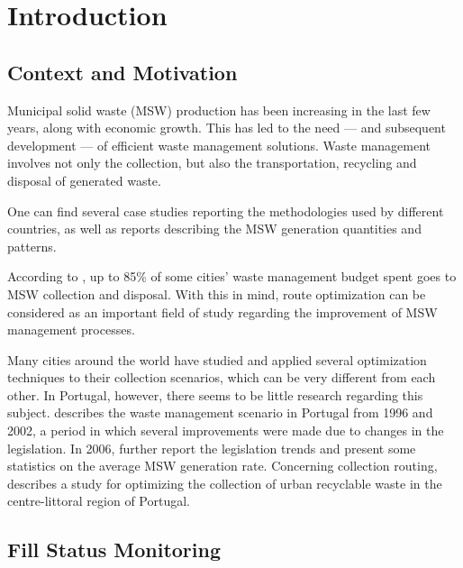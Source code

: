 \chapter{Introduction} \label{chap:intro}

\section*{}


\section{Context and Motivation}
\label{section:context}

Municipal solid waste (MSW) production has been increasing in the last few
years, along with economic growth\citep{McCarthy94}. This has led to the need
--- and subsequent development --- of efficient waste management solutions.
Waste management involves not only the collection, but also the transportation,
recycling and disposal of generated waste.

One can find several case studies reporting the methodologies used by different
countries, as well as reports describing the MSW generation quantities and
patterns.

According to \citet{Bhat1996}, up to 85\% of some cities' waste management
budget spent goes to MSW collection and disposal. With this in mind, route
optimization can be considered as an important field of study regarding the
improvement of MSW management processes.

Many cities around the world have studied and applied several optimization
techniques to their collection scenarios, which can be very different from each
other. In Portugal, however, there seems to be little research regarding this
subject. \citet{Passaro200397} describes the waste management scenario in
Portugal from 1996 and 2002, a period in which several improvements were made
due to changes in the legislation. In 2006, \citet{Magrinho20061477} further
report the legislation trends and present some statistics on the average MSW
generation rate. Concerning collection routing, \citet{Teixeira04} describes a
study for optimizing the collection of urban recyclable waste in the
centre-littoral region of Portugal.


\section{Fill Status Monitoring}
\label{section:monitoring}

